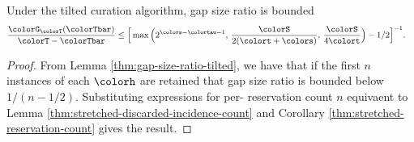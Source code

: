 \begin{theorem}
\label{thm:tilted-gap-size}
Under the tilted curation algorithm, gap size ratio is bounded
\begin{align*}
  \frac{\colorG_{\colorT}(\colorTbar)}{\colorT - \colorTbar}
  &\leq
  \Big[
    \max\Big(
      2^{\colors - \colortau - 1},\,
      \frac{\colorS}{2(\colort + \colors)},\,
      \frac{\colorS}{4\colort}
    \Big)
    - 1/2
  \Big]^{-1}.
\end{align*}
\end{theorem}
\begin{proof}

From Lemma \ref{thm:gap-size-ratio-tilted}, we have that if the first $n$ instances of each \hv{} $\colorh$ are retained that gap size ratio is bounded below $1/(n - 1/2)$.
Substituting expressions for per-\hv{} reservation count $n$ equivaent to Lemma \ref{thm:stretched-discarded-incidence-count} and Corollary \ref{thm:stretched-reservation-count} gives the result.
\end{proof}

